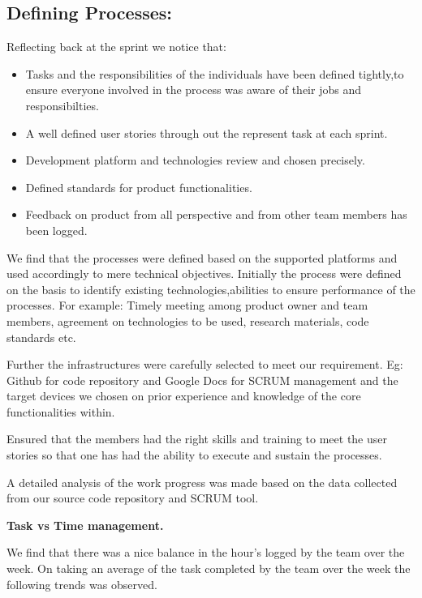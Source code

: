 \subsection{Defining Processes:}

Reflecting back at the sprint we notice that:

\begin{itemize}
	\item Tasks and the responsibilities of the individuals have been defined tightly,to ensure everyone involved in the process was aware  of their jobs and responsibilties.
	\item A well defined user stories through out the represent task at each sprint.
	\item Development platform and technologies review and chosen precisely.
	\item Defined standards for product functionalities.
	\item Feedback on product from all perspective and from other team members has been logged.
\end{itemize}

We find that the processes were defined based on the supported platforms and used accordingly to mere technical
objectives. Initially the process were defined on the basis to identify existing technologies,abilities to ensure
performance of the processes. For example: Timely meeting among product owner and team members,
agreement on technologies to be used, research materials, code standards etc.

Further the infrastructures were carefully selected to meet our requirement.
Eg: Github for code repository and Google Docs for SCRUM management and the target devices we chosen on prior experience and knowledge of the core functionalities within.

Ensured that the members had the right skills and training to meet the user stories so that one has had the ability to execute and sustain the processes.


A detailed analysis of the work progress was made based on the data collected from our source code repository and SCRUM tool.

\textbf{Task vs Time management.}

We find that there was a nice balance in the hour's logged by the team over the week. On taking an average of the task completed by the team over the week the following trends was observed.

